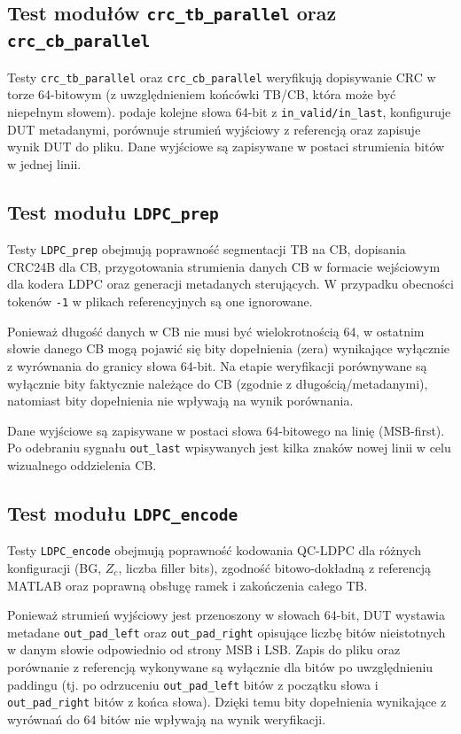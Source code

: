 \subsection{Test modułów \texttt{crc\_tb\_parallel} oraz \texttt{crc\_cb\_parallel}}
\label{subsec:tb_crc_parallel}

Testy \texttt{crc\_tb\_parallel} oraz \texttt{crc\_cb\_parallel} weryfikują dopisywanie CRC w torze 64-bitowym
(z uwzględnieniem końcówki TB/CB, która może być niepełnym słowem).
 podaje kolejne słowa 64-bit z \texttt{in\_valid/in\_last}, konfiguruje DUT metadanymi,
porównuje strumień wyjściowy z referencją oraz zapisuje wynik DUT do pliku.
Dane wyjściowe są zapisywane w postaci strumienia bitów w jednej linii.

\subsection{Test modułu \texttt{LDPC\_prep}}
\label{subsec:tb_ldpc_prep}

Testy \texttt{LDPC\_prep} obejmują poprawność segmentacji TB na CB, dopisania CRC24B dla CB,
przygotowania strumienia danych CB w formacie wejściowym dla kodera LDPC oraz generacji metadanych sterujących.
W przypadku obecności tokenów \texttt{-1} w plikach referencyjnych są one ignorowane.

Ponieważ długość danych w CB nie musi być wielokrotnością 64, w ostatnim słowie danego CB mogą pojawić się
bity dopełnienia (zera) wynikające wyłącznie z wyrównania do granicy słowa 64-bit.
Na etapie weryfikacji porównywane są wyłącznie bity faktycznie należące do CB (zgodnie z długością/metadanymi),
natomiast bity dopełnienia nie wpływają na wynik porównania.

Dane wyjściowe są zapisywane w postaci słowa 64-bitowego na linię (MSB-first). Po odebraniu sygnału
\texttt{out\_last} wpisywanych jest kilka znaków nowej linii w celu wizualnego oddzielenia CB.

\subsection{Test modułu \texttt{LDPC\_encode}}
\label{subsec:tb_ldpc_encode}

Testy \texttt{LDPC\_encode} obejmują poprawność kodowania QC-LDPC dla różnych konfiguracji (BG, $Z_c$, liczba filler bits),
zgodność bitowo-dokładną z referencją MATLAB oraz poprawną obsługę ramek i zakończenia całego TB.

Ponieważ strumień wyjściowy jest przenoszony w słowach 64-bit, DUT wystawia metadane \texttt{out\_pad\_left} oraz
\texttt{out\_pad\_right} opisujące liczbę bitów nieistotnych w danym słowie odpowiednio od strony MSB i LSB.
Zapis do pliku oraz porównanie z referencją wykonywane są wyłącznie dla bitów po uwzględnieniu paddingu
(tj. po odrzuceniu \texttt{out\_pad\_left} bitów z początku słowa i \texttt{out\_pad\_right} bitów z końca słowa).
Dzięki temu bity dopełnienia wynikające z wyrównań do 64 bitów nie wpływają na wynik weryfikacji.


